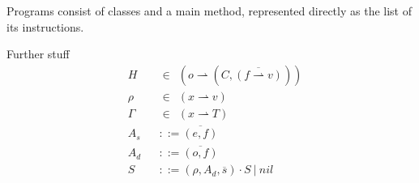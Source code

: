 Programs consist of classes and a main method, represented directly as the list of its instructions.


Further stuff
\begin{align*}
	 & H      &  & \in~~ (o \rightharpoonup (C,\overline{(f \rightharpoonup v)})) \\
	 & \rho   &  & \in~~ (x \rightharpoonup v)                                    \\
	 & \Gamma &  & \in~~ (x \rightharpoonup T)                                    \\
	 & A_s    &  & ::= \overline{(e, f)}                                          \\
	 & A_d    &  & ::= \overline{(o, f)}                                          \\
	 & S      &  & ::= (\rho, A_d, \overline{s}) \cdot S ~|~ nil
\end{align*}